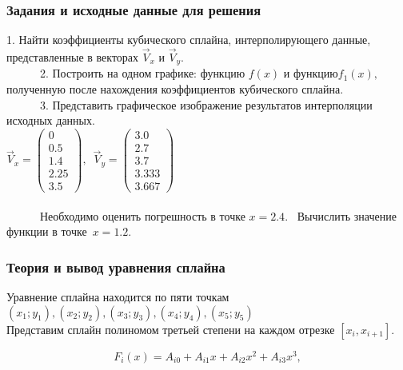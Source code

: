 \documentclass[russian,utf8,nocolumnxxxi,nocolumnxxxii]{eskdtext}
\begin{document}
      \subsubsection{Задания и исходные данные для решения} 
      $ $1. Найти коэффициенты кубического сплайна, интерполирующего данные, представленные в векторах$\,\,  {\vec{V}_x} \,\,$и$\,\, {\vec{V}_y.}$ \\
      $ {\,\,\,\,\,\,\,\,\,\,\,\,\,\,\,\,\,\,}$2. Построить на одном графике: функцию$\,\, {f(x)}\,\, $и$\,\,  функцию {f_1(x)}, $полученную после нахождения коэффициентов кубического сплайна.$ $ \\
      $ {\,\,\,\,\,\,\,\,\,\,\,\,\,\,\,\,\,\,}$3. Представить графическое изображение результатов интерполяции исходных данных$ $.\\
                       
      $\vec{V}_x=\left(\begin{array}{c}0\\0.5\\1.4\\2.25\\3.5\end{array}\right),
      \,\,\,\vec{V}_y=\left(\begin{array}{c}3.0\\2.7\\3.7\\3.333\\3.667\end{array}\right)$ \\\\
      $ {\,\,\,\,\,\,\,\,\,\,\,\,\,\,\,\,\,\,}$Необходимо оценить погрешность в точке $ {x = 2.4}. $\,\,\,\,\,Вычислить значение функции в точке $\,{x = 1.2}.$\\
      \newpage
      \newpage
      \subsubsection{Теория и вывод уравнения сплайна}
      Уравнение сплайна находится по пяти точкам\\
      $(x_1;y_1), (x_2;y_2), (x_3;y_3), (x_4;y_4), (x_5;y_5)$\\
      Представим сплайн полиномом третьей степени на каждом отрезке
      $[x_i, x_{i+1}]$.
      
      \begin{equation}\label{eq:F_i(x)}
      F_i(x)=A_{i0}+{A_{i1}}x+{A_{i2}}x^2+{A_{i3}}x^3,
      \end{equation}
      
\end{document}
